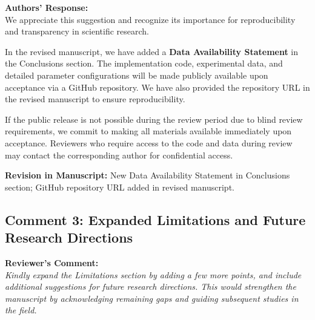 \documentclass[11pt,a4paper]{article}
\newcommand{\reviewercomment}[1]{%
  \vspace{6pt}\noindent\textbf{\textcolor{reviewercolor}{Reviewer's Comment:}}\\
  \textcolor{reviewercolor}{\itshape #1}\vspace{4pt}}
\newcommand{\response}[1]{%
  \noindent\textbf{\textcolor{responsecolor}{Authors' Response:}}\\
  #1\vspace{8pt}}
\newcommand{\revision}[1]{%
  \noindent\textbf{Revision in Manuscript:} #1\vspace{4pt}}
\begin{document}
\response{We appreciate this suggestion and recognize its importance for reproducibility and transparency in scientific research.

In the revised manuscript, we have added a \textbf{Data Availability Statement} in the Conclusions section. The implementation code, experimental data, and detailed parameter configurations will be made publicly available upon acceptance via a GitHub repository. We have also provided the repository URL in the revised manuscript to ensure reproducibility.

If the public release is not possible during the review period due to blind review requirements, we commit to making all materials available immediately upon acceptance. Reviewers who require access to the code and data during review may contact the corresponding author for confidential access.}

\revision{New Data Availability Statement in Conclusions section; GitHub repository URL added in revised manuscript.}

\subsection*{Comment 3: Expanded Limitations and Future Research Directions}

\reviewercomment{Kindly expand the Limitations section by adding a few more points, and include additional suggestions for future research directions. This would strengthen the manuscript by acknowledging remaining gaps and guiding subsequent studies in the field.}
\end{document}
